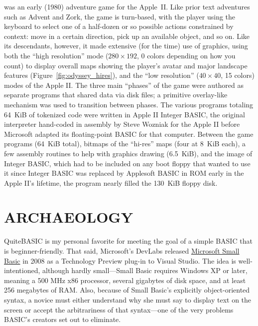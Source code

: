 \documentclass{article}
\begin{document}


 was an early (1980) adventure game
for the Apple~II.
Like prior text adventures such as Advent and Zork, the game is
turn-based, with the player using the 
keyboard to select one of a half-dozen or so possible actions
constrained by context: move in a certain direction, pick up an
available object, and so on.
Like its descendants, however, it made extensive (for the time) use of
graphics, using both the ``high resolution'' mode ($280\times 192$, 0 colors
depending on how you count) to display overall maps showing the player's
avatar and major landscape features (Figure~\ref{fig:odyssey_hires}), and the
``low resolution'' ($40\times 40$, 15
colors) modes of the Apple II.
The three main ``phases'' of the game were authored as separate programs
that shared data via disk files; a primitive overlay-like mechanism was
used to transition between phases.  
The various programs totaling 64~KiB of tokenized code were written in Apple II Integer
BASIC, the
original interpreter hand-coded in assembly by Steve Wozniak for
the Apple II before Microsoft adapted its floating-point BASIC for that
computer.  Between the game programs (64~KiB total), bitmaps of the ``hi-res''
maps (four at 8~KiB each), a few assembly routines to help with graphics
drawing (6.5~KiB), and the image of Integer BASIC, which had to be
included on any boot floppy that wanted to use it since Integer BASIC
was replaced by Applesoft BASIC in ROM early in the Apple II's lifetime,
the program nearly filled the 130~KiB floppy disk.

\section{ARCHAEOLOGY}


QuiteBASIC is my personal favorite for meeting the goal of a simple
BASIC that is beginner-friendly.  That said,
Microsoft's DevLabs 
released \href{http://smallbasic.com}{Microsoft Small Basic} in 2008 as a
Technology Preview plug-in to Visual Studio.
The idea is well-intentioned, although hardly small---Small Basic
requires Windows XP or later, meaning a 500
MHz x86 processor, several gigabytes of disk space, and at least 256
megabytes of RAM.
Also, because of Small Basic's explicitly
object-oriented syntax,  a novice must either understand why she
must say  to display text on the
screen or accept the arbitrariness of that syntax---one of the very problems
BASIC's creators set out to eliminate.  
\end{document}
